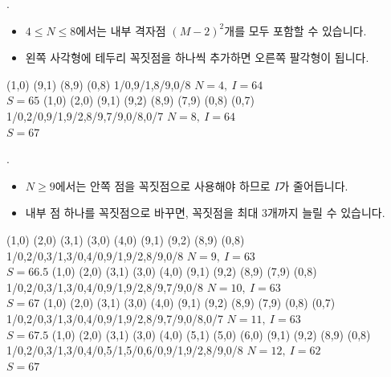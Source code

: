 \begin{frame}{\textbf{\pletter}. \ptitle}
    \begin{itemize}
        \item $4\le N\le8$에서는 내부 격자점 $(M-2)^2$개를 모두 포함할 수 있습니다.
        \item 왼쪽 사각형에 테두리 꼭짓점을 하나씩 추가하면 오른쪽 팔각형이 됩니다.
    \end{itemize}
    \begin{center}
            {(1,0) (9,1) (8,9) (0,8)}
            {1/0,9/1,8/9,0/8}
            {$N=4,\ I=64$\\$S=65$}
        \hspace{1.4cm}
            {(1,0) (2,0) (9,1) (9,2) (8,9) (7,9) (0,8) (0,7)}
            {1/0,2/0,9/1,9/2,8/9,7/9,0/8,0/7}
            {$N=8,\ I=64$\\$S=67$}
    \end{center}
\end{frame}

\begin{frame}{\textbf{\pletter}. \ptitle}
    \begin{itemize}
        \item $N\ge9$에서는 안쪽 점을 꼭짓점으로 사용해야 하므로 $I$가 줄어듭니다.
        \item 내부 점 하나를 꼭짓점으로 바꾸면, 꼭짓점을 최대 $3$개까지 늘릴 수 있습니다.
    \end{itemize}
    \begin{center}
            {(1,0) (2,0) (3,1) (3,0) (4,0) (9,1) (9,2) (8,9) (0,8)}
            {1/0,2/0,3/1,3/0,4/0,9/1,9/2,8/9,0/8}
            {$N=9,\ I=63$\\$S=66.5$}
        \hspace{0.17cm}
            {(1,0) (2,0) (3,1) (3,0) (4,0) (9,1) (9,2) (8,9) (7,9) (0,8)}
            {1/0,2/0,3/1,3/0,4/0,9/1,9/2,8/9,7/9,0/8}
            {$N=10,\ I=63$\\$S=67$}
        \hspace{0.17cm}
            {(1,0) (2,0) (3,1) (3,0) (4,0) (9,1) (9,2) (8,9) (7,9) (0,8) (0,7)}
            {1/0,2/0,3/1,3/0,4/0,9/1,9/2,8/9,7/9,0/8,0/7}
            {$N=11,\ I=63$\\$S=67.5$}
        \hspace{0.17cm}
            {(1,0) (2,0) (3,1) (3,0) (4,0) (5,1) (5,0) (6,0) (9,1) (9,2) (8,9) (0,8)}
            {1/0,2/0,3/1,3/0,4/0,5/1,5/0,6/0,9/1,9/2,8/9,0/8}
            {$N=12,\ I=62$\\$S=67$}
    \end{center}
\end{frame}

